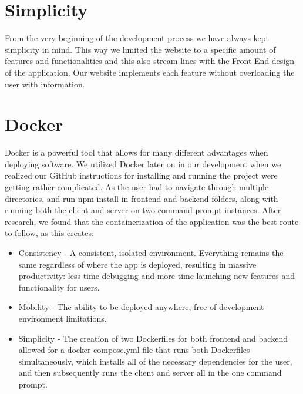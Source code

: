 \section{Simplicity}
From the very beginning of the development process we have always kept simplicity in mind. This way we limited the website to a specific amount of features and functionalities and this also stream lines with the Front-End design of the application. Our website implements each feature without overloading the user with information.

\section{Docker}

Docker is a powerful tool that allows for many different advantages when deploying software. We utilized Docker later on in our development when we realized our GitHub instructions for installing and running the project were getting rather complicated. As the user had to navigate through multiple directories, and run npm install in frontend and backend folders, along with running both the client and server on two command prompt instances. After research, we found that the containerization of the application was the best route to follow, as this creates:
\begin{itemize}
    \item Consistency - A consistent, isolated environment. Everything remains the same regardless of where the app is deployed, resulting in massive productivity: less time debugging and more time launching new features and functionality for users.
    \item Mobility - The ability to be deployed anywhere, free of development environment limitations. \item Simplicity - The creation of two Dockerfiles for both frontend and backend allowed for a docker-compose.yml file that runs both Dockerfiles simultaneously, which installs all of the necessary dependencies for the user, and then subsequently runs the client and server all in the one command prompt.
\end{itemize}

